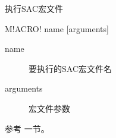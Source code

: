 \label{cmd:macro}

执行SAC宏文件

\begin{SACSTX}
M!ACRO! name [arguments]
\end{SACSTX}

\begin{description}
\item [name] 要执行的SAC宏文件名
\item [arguments] 宏文件参数
\end{description}

参考  一节。
